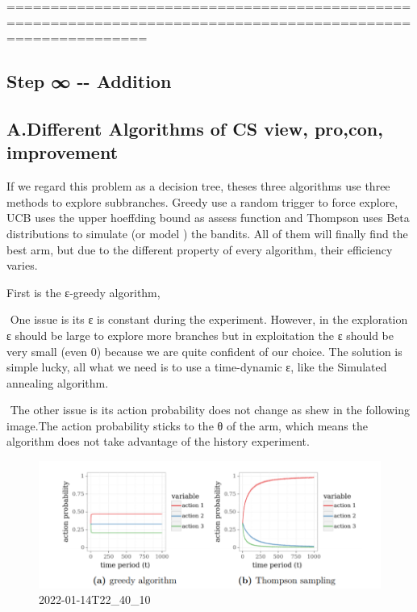 \documentclass[11pt]{article}
\makeatletter
\def\maxwidth{\ifdim\Gin@nat@width>\linewidth\linewidth
    \else\Gin@nat@width\fi}
\let\Oldincludegraphics\includegraphics
\renewcommand{\includegraphics}[1]{\Oldincludegraphics[width=.8\maxwidth]{#1}}
\makeatother
\begin{document}
    ============================================================================================================

    \subsection{Step ∞ -\/- Addition}\label{step----addition}

    \subsection{A.Different Algorithms of CS view, pro,con,
improvement}\label{a.different-algorithms-of-cs-view-procon-improvement}

    If we regard this problem as a decision tree, theses three algorithms
use three methods to explore subbranches. Greedy use a random trigger to
force explore, UCB uses the upper hoeffding bound as assess function and
Thompson uses Beta distributions to simulate (or model ) the bandits.
All of them will finally find the best arm, but due to the different
property of every algorithm, their efficiency varies.

First is the ε-greedy algorithm,

​ One issue is its ε is constant during the experiment. However, in the
exploration ε should be large to explore more branches but in
exploitation the ε should be very small (even 0) because we are quite
confident of our choice. The solution is simple lucky, all what we need
is to use a time-dynamic ε, like the Simulated annealing algorithm.

​ The other issue is its action probability does not change as shew in
the following image.The action probability sticks to the θ of the arm,
which means the algorithm does not take advantage of the history
experiment.

    \begin{figure}
\centering
\includegraphics{gandt.png}
\caption{2022-01-14T22\_40\_10}
\end{figure}
\end{document}
